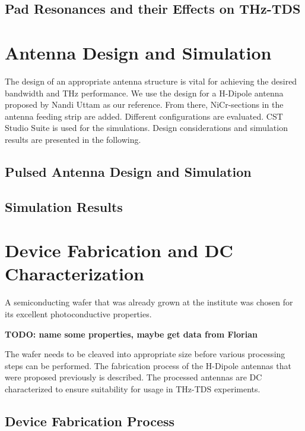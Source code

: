 \documentclass[
	german,%
	accentcolor=9c,%
	ruledheaders=section,%
	class=report,%
	thesis={type=bachelor},%
	fontsize=11pt,%
	parskip=half-,%
	custommargins=false,%
	marginpar=false,%
	BCOR=0mm,%
 	logofile=tools/logo-installation/TUDa-logos/tuda_logo.png,%
]{tudapub}
\begin{document}
\section{Pad Resonances and their Effects on THz-TDS}


\chapter{Antenna Design and Simulation}

The design of an appropriate antenna structure is vital for achieving the desired bandwidth and THz performance. We use the design for a H-Dipole antenna proposed by Nandi Uttam \cite{nandiErAsInAlGaAsPhotoconductors2021} as our reference. From there, NiCr-sections in the antenna feeding strip are added. Different configurations are evaluated. CST Studio Suite is used for the simulations. Design considerations and simulation results are presented in the following.

\section{Pulsed Antenna Design and Simulation}



\section{Simulation Results}




\chapter{Device Fabrication and DC Characterization}
A semiconducting wafer that was already grown at the institute was chosen for its excellent photoconductive properties.

\textbf{TODO: name some properties, maybe get data from Florian}

The wafer needs to be cleaved into appropriate size before various processing steps can be performed. The fabrication process of the H-Dipole antennas that were proposed previously is described. The processed antennas are DC characterized to ensure suitability for usage in THz-TDS experiments. 


\section{Device Fabrication Process}
\end{document}
